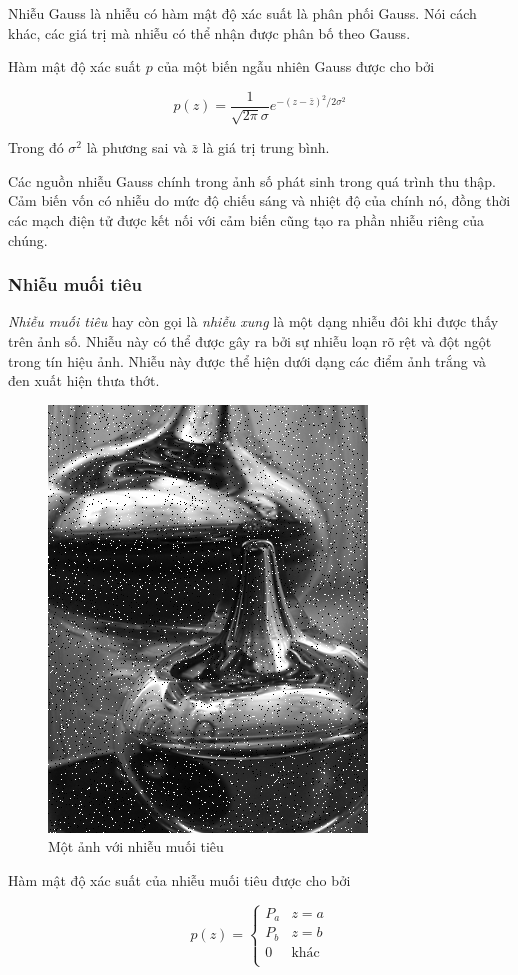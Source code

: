 Nhiễu Gauss là nhiễu có hàm mật độ xác suất là phân phối Gauss. Nói cách khác, các giá trị mà nhiễu có thể nhận được phân bố theo Gauss.

Hàm mật độ xác suất $p$ của một biến ngẫu nhiên Gauss được cho bởi

$$p(z) = \frac{1}{\sqrt{2\pi} \sigma}e^{-(z-\bar{z})^2 / 2\sigma^2}$$

Trong đó $\sigma^2$ là phương sai và $\bar{z}$ là giá trị trung bình.

Các nguồn nhiễu Gauss chính trong ảnh số phát sinh trong quá trình thu thập. Cảm biến vốn có nhiễu do mức độ chiếu sáng và nhiệt độ của chính nó, đồng thời các mạch điện tử được kết nối với cảm biến cũng tạo ra phần nhiễu riêng của chúng.

\subsubsection{Nhiễu muối tiêu}

\textit{Nhiễu muối tiêu} hay còn gọi là \textit{nhiễu xung} là một dạng nhiễu đôi khi được thấy trên ảnh số. Nhiễu này có thể được gây ra bởi sự nhiễu loạn rõ rệt và đột ngột trong tín hiệu ảnh. Nhiễu này được thể hiện dưới dạng các điểm ảnh trắng và đen xuất hiện thưa thớt.

\begin{figure}[H]
    \centering
    \includegraphics[width=0.5\linewidth]{images/salt_and_pepper_noise.png}
    \caption{Một ảnh với nhiễu muối tiêu}
    \label{fig:salt_and_pepper_noise}
\end{figure}

Hàm mật độ xác suất của nhiễu muối tiêu được cho bởi

$$p(z) = \left\{\begin{matrix}
P_a & z = a \\
P_b & z = b \\
0 & \text{khác} \\
\end{matrix}\right.$$


